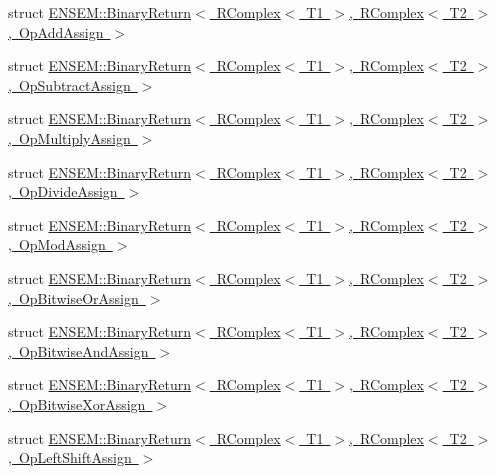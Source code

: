 \begin{DoxyCompactItemize}
\item 
struct \mbox{\hyperlink{structENSEM_1_1BinaryReturn_3_01RComplex_3_01T1_01_4_00_01RComplex_3_01T2_01_4_00_01OpAddAssign_01_4}{E\+N\+S\+E\+M\+::\+Binary\+Return$<$ R\+Complex$<$ T1 $>$, R\+Complex$<$ T2 $>$, Op\+Add\+Assign $>$}}
\item 
struct \mbox{\hyperlink{structENSEM_1_1BinaryReturn_3_01RComplex_3_01T1_01_4_00_01RComplex_3_01T2_01_4_00_01OpSubtractAssign_01_4}{E\+N\+S\+E\+M\+::\+Binary\+Return$<$ R\+Complex$<$ T1 $>$, R\+Complex$<$ T2 $>$, Op\+Subtract\+Assign $>$}}
\item 
struct \mbox{\hyperlink{structENSEM_1_1BinaryReturn_3_01RComplex_3_01T1_01_4_00_01RComplex_3_01T2_01_4_00_01OpMultiplyAssign_01_4}{E\+N\+S\+E\+M\+::\+Binary\+Return$<$ R\+Complex$<$ T1 $>$, R\+Complex$<$ T2 $>$, Op\+Multiply\+Assign $>$}}
\item 
struct \mbox{\hyperlink{structENSEM_1_1BinaryReturn_3_01RComplex_3_01T1_01_4_00_01RComplex_3_01T2_01_4_00_01OpDivideAssign_01_4}{E\+N\+S\+E\+M\+::\+Binary\+Return$<$ R\+Complex$<$ T1 $>$, R\+Complex$<$ T2 $>$, Op\+Divide\+Assign $>$}}
\item 
struct \mbox{\hyperlink{structENSEM_1_1BinaryReturn_3_01RComplex_3_01T1_01_4_00_01RComplex_3_01T2_01_4_00_01OpModAssign_01_4}{E\+N\+S\+E\+M\+::\+Binary\+Return$<$ R\+Complex$<$ T1 $>$, R\+Complex$<$ T2 $>$, Op\+Mod\+Assign $>$}}
\item 
struct \mbox{\hyperlink{structENSEM_1_1BinaryReturn_3_01RComplex_3_01T1_01_4_00_01RComplex_3_01T2_01_4_00_01OpBitwiseOrAssign_01_4}{E\+N\+S\+E\+M\+::\+Binary\+Return$<$ R\+Complex$<$ T1 $>$, R\+Complex$<$ T2 $>$, Op\+Bitwise\+Or\+Assign $>$}}
\item 
struct \mbox{\hyperlink{structENSEM_1_1BinaryReturn_3_01RComplex_3_01T1_01_4_00_01RComplex_3_01T2_01_4_00_01OpBitwiseAndAssign_01_4}{E\+N\+S\+E\+M\+::\+Binary\+Return$<$ R\+Complex$<$ T1 $>$, R\+Complex$<$ T2 $>$, Op\+Bitwise\+And\+Assign $>$}}
\item 
struct \mbox{\hyperlink{structENSEM_1_1BinaryReturn_3_01RComplex_3_01T1_01_4_00_01RComplex_3_01T2_01_4_00_01OpBitwiseXorAssign_01_4}{E\+N\+S\+E\+M\+::\+Binary\+Return$<$ R\+Complex$<$ T1 $>$, R\+Complex$<$ T2 $>$, Op\+Bitwise\+Xor\+Assign $>$}}
\item 
struct \mbox{\hyperlink{structENSEM_1_1BinaryReturn_3_01RComplex_3_01T1_01_4_00_01RComplex_3_01T2_01_4_00_01OpLeftShiftAssign_01_4}{E\+N\+S\+E\+M\+::\+Binary\+Return$<$ R\+Complex$<$ T1 $>$, R\+Complex$<$ T2 $>$, Op\+Left\+Shift\+Assign $>$}}
\item 

\end{DoxyCompactItemize}
